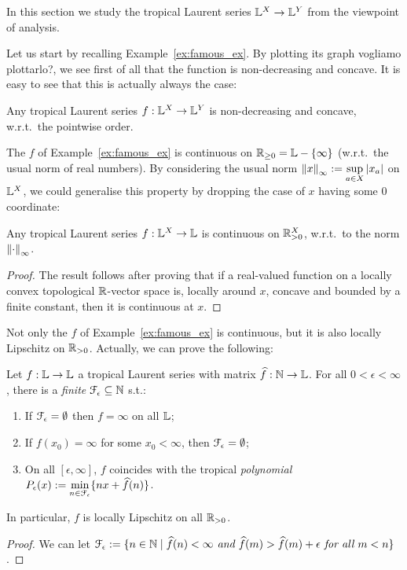 In this section we study the tropical Laurent series $\mathbb{L}^X\to \mathbb{L} ^Y$ from the viewpoint of analysis.

Let us start by recalling Example~\ref{ex:famous_ex}.
By plotting its graph {\color{red}vogliamo plottarlo?}, we see first of all that the function is non-decreasing and concave.
It is easy to see that this is actually always the case:

\begin{proposition}\label{prop:nondecr+conc}
 Any tropical Laurent series $f:\mathbb{L}^X\to\mathbb{L}^Y$ is non-decreasing and concave, w.r.t.\ the pointwise order.
\end{proposition}

The $f$ of Example~\ref{ex:famous_ex} is continuous on $\mathbb{R}_{\geq0}=\mathbb{L}-\{\infty\}$ (w.r.t.\ the usual norm of real numbers).
By considering the usual norm $\left\lVert x\right\rVert_\infty:=\sup\limits_{a\in X} \left\lvert x_a\right\rvert$ on $\mathbb{L}^X$, we could generalise this property by dropping the case of $x$ having some $0$ coordinate:

\begin{theorem}\label{thm:cont}
 Any tropical Laurent series $f:\mathbb{L}^X\to\mathbb{L}$ is continuous on $\mathbb{R}_{>0}^X$, w.r.t.\ to the norm $\left\lVert\cdot\right\rVert_\infty$.
\end{theorem}
\begin{proof}
 The result follows after proving that if a real-valued function on a locally convex topological $\mathbb{R}$-vector space is, locally around $x$, concave and bounded by a finite constant, then it is continuous at $x$.
\end{proof}

Not only the $f$ of Example~\ref{ex:famous_ex} is continuous, but it is also locally Lipschitz on $\mathbb{R}_{>0}$.
Actually, we can prove the following:

\begin{theorem}
 Let $f:\mathbb{L}\to\mathbb{L}$ a tropical Laurent series with matrix $\widehat f:\mathbb{N}\to\mathbb{L}$.
 For all $0<\epsilon<\infty$, there is a \emph{finite} $\mathcal{F}_\epsilon \subseteq \mathbb{N}$ s.t.:
 \begin{enumerate}
  \item If $\mathcal{F}_\epsilon=\emptyset$ then $f=\infty$ on all $\mathbb{L}$;
  \item If $f(x_0)=\infty$ for some $x_0<\infty$, then $\mathcal{F}_\epsilon=\emptyset$;
  \item On all $[\epsilon,\infty]$, $f$ coincides with the tropical \emph{polynomial} $P_\epsilon(x):=\min\limits_{n\in \mathcal{F}_\epsilon}\{nx+\widehat f(n)\}$.
 \end{enumerate}
 In particular, $f$ is locally Lipschitz on all $\mathbb{R}_{>0}$.
\end{theorem}
\begin{proof}
 We can let $\mathcal{F}_\epsilon:=\{n\in\mathbb{N} \mid
 \widehat f(n)<\infty \textit{ and } \widehat f(m)> \widehat f(m)+\epsilon \textit{ for all } m<n\}$.
\end{proof}

